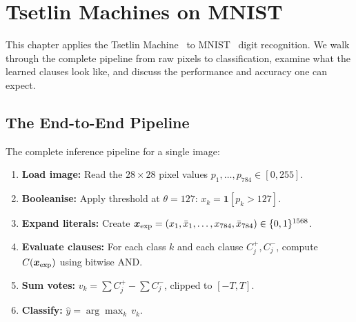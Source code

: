 \chapter{Tsetlin Machines on MNIST}
\label{ch:tm-mnist}

This chapter applies the Tsetlin Machine~\cite{granmo2018tsetlin} to MNIST~\cite{lecun1998mnist} digit recognition.
We walk through the complete pipeline from raw pixels to classification,
examine what the learned clauses look like, and discuss the performance
and accuracy one can expect.


\section{The End-to-End Pipeline}
\label{sec:tm-pipeline}

The complete inference pipeline for a single image:

\begin{enumerate}
  \item \textbf{Load image:} Read the $28 \times 28$ pixel values
    $p_1, \ldots, p_{784} \in [0, 255]$.
  \item \textbf{Booleanise:} Apply threshold at $\theta = 127$:
    $x_k = \mathbf{1}[p_k > 127]$.
  \item \textbf{Expand literals:} Create
    $\bm{x}_{\text{exp}} = (x_1, \bar{x}_1, \ldots, x_{784},
    \bar{x}_{784}) \in \{0,1\}^{1568}$.
  \item \textbf{Evaluate clauses:} For each class $k$ and each
    clause $C_j^+, C_j^-$, compute $C(\bm{x}_{\text{exp}})$ using
    bitwise AND.
  \item \textbf{Sum votes:} $v_k = \sum C_j^+ - \sum C_j^-$, clipped
    to $[-T, T]$.
  \item \textbf{Classify:} $\hat{y} = \arg\max_k \, v_k$.
\end{enumerate}

